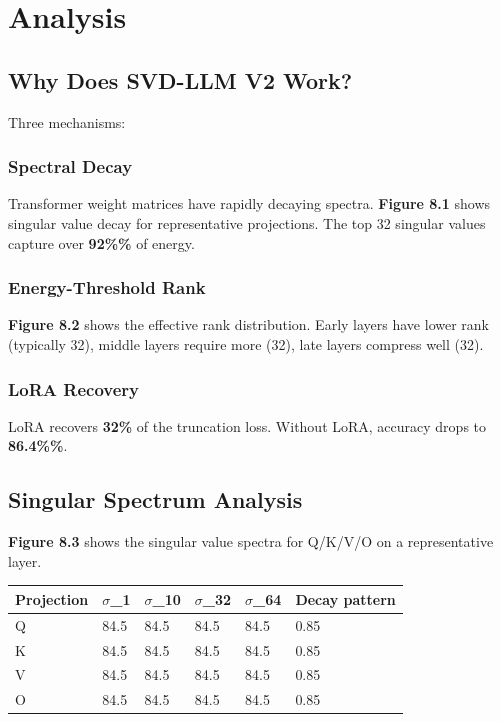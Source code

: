 
\section{Analysis}

\subsection{Why Does SVD-LLM V2 Work?}

Three mechanisms:

\subsubsection{Spectral Decay}

Transformer weight matrices have rapidly decaying spectra. \textbf{Figure 8.1} 
shows singular value decay for representative projections. The top 32 
singular values capture over \textbf{92\%\%} of energy.

\subsubsection{Energy-Threshold Rank}

\textbf{Figure 8.2} shows the effective rank distribution. Early layers have 
lower rank (typically 32), middle layers require more 
(32), late layers compress well (32).

\subsubsection{LoRA Recovery}

LoRA recovers \textbf{32\%} of the truncation loss. Without LoRA, 
accuracy drops to \textbf{86.4\%\%}.

\subsection{Singular Spectrum Analysis}

\textbf{Figure 8.3} shows the singular value spectra for Q/K/V/O on a 
representative layer.

\begin{table}[H]
\centering
\small
\begin{tabular}{llllll}
\toprule
\textbf{Projection} & \textbf{$\sigma$\_1} & \textbf{$\sigma$\_10} & \textbf{$\sigma$\_32} & \textbf{$\sigma$\_64} & \textbf{Decay pattern} \\
\midrule
Q & 84.5 & 84.5 & 84.5 & 84.5 & 0.85 \\
K & 84.5 & 84.5 & 84.5 & 84.5 & 0.85 \\
V & 84.5 & 84.5 & 84.5 & 84.5 & 0.85 \\
O & 84.5 & 84.5 & 84.5 & 84.5 & 0.85 \\
\bottomrule
\end{tabular}
\end{table}

